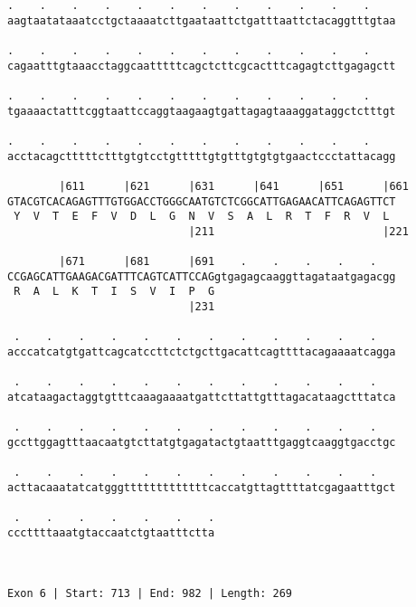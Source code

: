 \documentclass{article}
\begin{document}
\begin{Verbatim}
.    .    .    .    .    .    .    .    .    .    .    .    
aagtaatataaatcctgctaaaatcttgaataattctgatttaattctacaggtttgtaa
                                                            
.    .    .    .    .    .    .    .    .    .    .    .    
cagaatttgtaaacctaggcaatttttcagctcttcgcactttcagagtcttgagagctt
                                                            
.    .    .    .    .    .    .    .    .    .    .    .    
tgaaaactatttcggtaattccaggtaagaagtgattagagtaaaggataggctctttgt
                                                            
.    .    .    .    .    .    .    .    .    .    .    .    
acctacagctttttctttgtgtcctgtttttgtgtttgtgtgtgaactccctattacagg
                                                            
        |611      |621      |631      |641      |651      |661
GTACGTCACAGAGTTTGTGGACCTGGGCAATGTCTCGGCATTGAGAACATTCAGAGTTCT
 Y  V  T  E  F  V  D  L  G  N  V  S  A  L  R  T  F  R  V  L 
                            |211                          |221
  
        |671      |681      |691    .    .    .    .    .   
CCGAGCATTGAAGACGATTTCAGTCATTCCAGgtgagagcaaggttagataatgagacgg
 R  A  L  K  T  I  S  V  I  P  G                            
                            |231                            
  
 .    .    .    .    .    .    .    .    .    .    .    .   
acccatcatgtgattcagcatccttctctgcttgacattcagttttacagaaaatcagga
                                                            
 .    .    .    .    .    .    .    .    .    .    .    .   
atcataagactaggtgtttcaaagaaaatgattcttattgtttagacataagctttatca
                                                            
 .    .    .    .    .    .    .    .    .    .    .    .   
gccttggagtttaacaatgtcttatgtgagatactgtaatttgaggtcaaggtgacctgc
                                                            
 .    .    .    .    .    .    .    .    .    .    .    .   
acttacaaatatcatgggtttttttttttttcaccatgttagttttatcgagaatttgct
                                                            
 .    .    .    .    .    .    .
cccttttaaatgtaccaatctgtaatttctta
                                
                                
 
Exon 6 | Start: 713 | End: 982 | Length: 269




\end{Verbatim}
\end{document}
